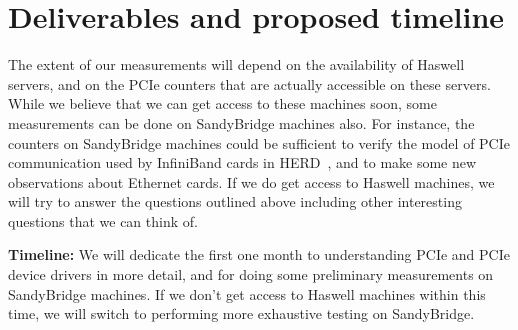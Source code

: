 \section{Deliverables and proposed timeline}
\label{sec:design}
The extent of our measurements will depend on the availability of Haswell
servers, and on the PCIe counters that are actually accessible on these servers.
While we believe that we can get access to these machines soon,
some measurements can be done on SandyBridge machines also. For instance,
the counters on SandyBridge machines could be sufficient to verify the model
of PCIe communication used by InfiniBand cards in HERD~\cite{Kalia:sigcomm2014},
and to make some new observations about Ethernet cards. If we do get access
to Haswell machines, we will try to answer the questions outlined above including
other interesting questions that we can think of.

\textbf{Timeline:} We will dedicate the first one month to understanding PCIe
and PCIe device drivers in more detail, and for doing some preliminary
measurements on SandyBridge machines. If we don't get access to Haswell machines
within this time, we will switch to performing more exhaustive testing on
SandyBridge.
